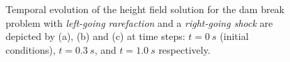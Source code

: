\documentclass[10pt,a4paper]{article}
\begin{document}
	\begin{figure}[H]
		\hfill
		\caption{Temporal evolution of the height field solution for the dam break problem with {\em left-going rarefaction} and a {\em right-going shock}  are depicted by (a), (b) and (c) at time steps: $t=0~s$ (initial conditions), $t = 0.3~s$, and $t = 1.0~s$ respectively.  }
		\label{fig:hor2}
	\end{figure}
	
\end{document}

